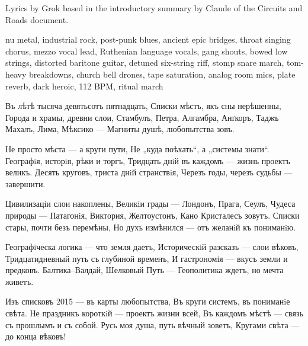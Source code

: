
\begin{notes}
Lyrics by Grok based in the introductory summary by Claude of the Circuits and Roads document.
\end{notes}
\begin{style}
nu metal, industrial rock, post-punk blues, ancient epic bridges, throat singing chorus, mezzo vocal lead, Ruthenian language vocals, gang shouts, bowed low strings, distorted baritone guitar, detuned six-string riff, stomp snare march, tom-heavy breakdowns, church bell drones, tape saturation, analog room mics, plate reverb, dark heroic, 112 BPM, ritual march
\end{style}
\begin{lyrics}
Въ лѣтѣ тысяча девятьсотъ пятнадцать,
Списки мѣстъ, якъ сны нерѣшенны,
Города и храмы, древни слои,
Стамбулъ, Петра, Алгамбра, Анґкоръ,
Таджъ Махалъ, Лима, Мѣксико —
Магниты душѣ, любопытства зовъ.

Не просто мѣста — а круги пути,
Не „куда поѣхать“, а „системы знати“.
Географiя, исторiя, рѣки и торгъ,
Тридцать днiй въ каждомъ — жизнь проектъ великъ.
Десять круговъ, триста днiй странствiя,
Черезъ годы, черезъ судьбы — завершити.

Цивилизацiи слои накоплены,
Великiи грады — Лондонъ, Прага, Сеулъ,
Чудеса природы — Патагонiя, Виктория,
Желтоустонъ, Кано Кристалесъ зовутъ.
Списки стары, почти безъ перемѣны,
Но духъ измѣнился — отъ желанiй къ пониманiю.

Географiческа логика — что земля даетъ,
Историческiй разсказъ — слои вѣковъ,
Тридцатидневный путь съ глубиной временъ,
И гастрономiя — вкусъ земли и предковъ.
Балтика–Валдай, Шелковый Путь —
Геополитика ждетъ, но мечта живетъ.

Изъ списковъ 2015 — въ карты любопытства,
Въ круги системъ, въ пониманiе свѣта.
Не праздникъ короткiй — проектъ жизни всей,
Въ каждомъ мѣстѣ — связь съ прошлымъ и съ собой.
Русь моя душа, путь вѣчный зоветъ,
Кругами свѣта — до конца вѣковъ!
\end{lyrics}

